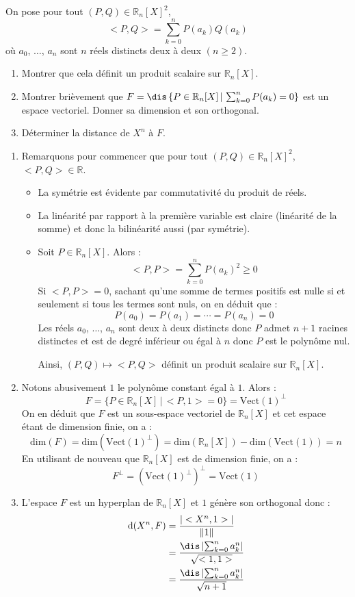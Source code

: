 \documentclass[a4paper,10pt]{report}
\begin{document}
\begin{Exa} On pose pour tout $(P,Q) \in \mathbb{R}_n[X]^2$,
$$ <P,Q> = \sum_{k=0}^n P(a_k) Q(a_k)$$
où $a_0$, $\ldots$, $a_n$ sont $n$ réels distincts deux à deux $(n \geq 2)$.
\begin{enumerate}
\item Montrer que cela définit un produit scalaire sur $\mathbb{R}_n[X]$.
\item Montrer brièvement que $F= \dis \left\lbrace P \in \mathbb{R}_n[X] \, \vert \, \sum_{k=0}^n P(a_k)=0 \right\rbrace$ est un espace vectoriel. Donner sa dimension et son orthogonal.
\item Déterminer la distance de $X^n$ à $F$.
\end{enumerate}
\end{Exa}

\corr \begin{enumerate}
\item Remarquons pour commencer que pour tout $(P,Q) \in \mathbb{R}_n[X]^2$, $<P,Q> \in \mathbb{R}$.
\begin{itemize}
\item La symétrie est évidente par commutativité du produit de réels.
\item La linéarité par rapport à la première variable est claire (linéarité de la somme) et donc la bilinéarité aussi (par symétrie).
\item Soit $P \in \mathbb{R}_n[X]$. Alors :
$$ <P,P> =  \sum_{k=0}^n P(a_k)^2 \geq 0$$
Si $<P,P>=0$, sachant qu'une somme de termes positifs est nulle si et seulement si tous les termes sont nuls, on en déduit que :
$$ P(a_0)= P(a_1) = \cdots = P(a_n)=0$$
Les réels $a_0$, $\ldots$, $a_n$ sont deux à deux distincts donc $P$ admet $n+1$ racines distinctes et est de degré inférieur ou égal à $n$ donc $P$ est le polynôme nul.

\medskip

\noindent Ainsi, $(P,Q) \mapsto <P,Q>$ définit un produit scalaire sur $\mathbb{R}_n[X]$.
\end{itemize}
\item Notons abusivement $1$ le polynôme constant égal à $1$. Alors :
$$ F = \lbrace P \in \mathbb{R}_n[X] \, \vert \, <P,1>= 0 \rbrace = \textrm{Vect}(1)^{\perp}$$
On en déduit que $F$ est un sous-espace vectoriel de $ \mathbb{R}_n[X]$ et cet espace étant de dimension finie, on a :
$$ \textrm{dim}(F) =  \textrm{dim}(\textrm{Vect}(1)^{\perp}) =  \textrm{dim}(\mathbb{R}_n[X]) -  \textrm{dim}(\textrm{Vect}(1)) = n$$
En utilisant de nouveau que $ \mathbb{R}_n[X]$ est de dimension finie, on a :
$$ F^{\perp} = (\textrm{Vect}(1)^{\perp})^{\perp} = \textrm{Vect}(1)$$
\item L'espace $F$ est un hyperplan de $\mathbb{R}_n[X]$ et $1$ génère son orthogonal donc :
\begin{align*}
\textrm{d}(X^n, F) & = \dfrac{\vert <X^n,1> \vert}{\Vert 1 \Vert} \\
& = \dfrac{\dis\left\vert \sum_{k=0}^n a_k^n \right\vert }{\sqrt{<1,1>}} \\
& = \dfrac{\dis\left\vert \sum_{k=0}^n a_k^n \right\vert }{\sqrt{n+1}} 
\end{align*}
\end{enumerate}
\end{document}
